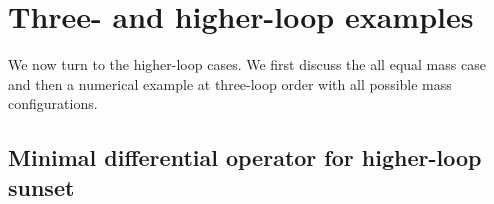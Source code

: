 \documentclass[a4paper,12pt]{article}
\numberwithin{equation}{section}
\numberwithin{figure}{section}
\begin{document}
\section{Three- and higher-loop examples}\label{sec:higherloop}

We now turn to the higher-loop cases. We first discuss the all equal
mass case and then a numerical example at three-loop order with all
possible mass configurations.

\subsection{Minimal differential operator for higher-loop sunset}
\begin{comment}
\begin{figure}[h]
  \centering
      \begin{tikzpicture}[baseline=(x)]
        \begin{feynman}
       \vertex (x);
      \vertex[left=2cm of x,label=$p$](c1l);
      \vertex[right=2cm of x,label=$p$](c1r);
        \vertex [left=1cm  of x] (xl);
        \vertex [right=1cm  of x] (xr);
        \draw [color = black, fill=none, very thick] (xl)  -- (xr);
        \draw [color = black, fill=none, very thick] (c1l)  -- (xl);
        \draw [color = black, fill=none, very thick] (xr)  -- (c1r);
        \diagram* {
         (c1l) -- [fermion] (xl);
         (xr) -- [fermion] (c1r);
         (xl)  [color = black, fill=none, very thick] -- (xr);
                                };
                              \end{feynman}
                                           \begin{pgfonlayer}{bg}
                                             \draw  [color = black, fill=none, very thick]  (x) circle (1.1cm);
                                              \draw  [color = black, fill=none, very thick] (x) ellipse (1.1cm
                                              and .8cm);
                                                \draw  [color = black, fill=none, very thick] (x) ellipse
                                                (1.1cm and .5cm);
                                                  \draw  [color =
                                                  black, fill=none,
                                                  very thick]  (x) ellipse (1.1cm and .3cm);
                        \end{pgfonlayer}
                   \end{tikzpicture}
  \caption{Multi-loop sunset}
  \label{fig:sunset}
\end{figure}
\end{comment}
\end{document}
